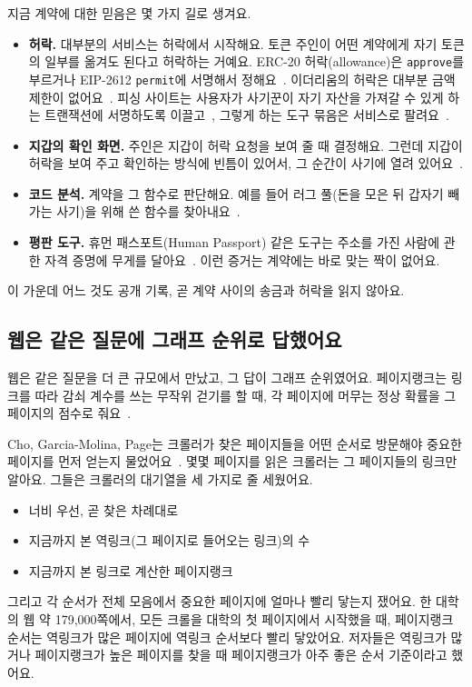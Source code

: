 지금 계약에 대한 믿음은 몇 가지 길로 생겨요.
\begin{itemize}
\item \textbf{허락.} 대부분의 서비스는 허락에서 시작해요. 토큰 주인이 어떤 계약에게 자기 토큰의 일부를 옮겨도 된다고 허락하는 거예요. ERC-20 허락(allowance)은 \texttt{approve}를 부르거나 EIP-2612 \texttt{permit}에 서명해서 정해요~\cite{vogelsteller2015erc20,lundfall2020permit}. 이더리움의 허락은 대부분 금액 제한이 없어요~\cite{wang2022unlimited}. 피싱 사이트는 사용자가 사기꾼이 자기 자산을 가져갈 수 있게 하는 트랜잭션에 서명하도록 이끌고~\cite{he2023txphishscope}, 그렇게 하는 도구 묶음은 서비스로 팔려요~\cite{he2025drainer}.
\item \textbf{지갑의 확인 화면.} 주인은 지갑이 허락 요청을 보여 줄 때 결정해요. 그런데 지갑이 허락을 보여 주고 확인하는 방식에 빈틈이 있어서, 그 순간이 사기에 열려 있어요~\cite{adamczyk2025approval}.
\item \textbf{코드 분석.} 계약을 그 함수로 판단해요. 예를 들어 러그 풀(돈을 모은 뒤 갑자기 빼 가는 사기)을 위해 쓴 함수를 찾아내요~\cite{lin2024crpwarner}.
\item \textbf{평판 도구.} 휴먼 패스포트(Human Passport) 같은 도구는 주소를 가진 사람에 관한 자격 증명에 무게를 달아요~\cite{humanpassportnddocs}. 이런 증거는 계약에는 바로 맞는 짝이 없어요.
\end{itemize}
이 가운데 어느 것도 공개 기록, 곧 계약 사이의 송금과 허락을 읽지 않아요.

\subsection{웹은 같은 질문에 그래프 순위로 답했어요}

웹은 같은 질문을 더 큰 규모에서 만났고, 그 답이 그래프 순위였어요. 페이지랭크는 링크를 따라 감쇠 계수를 쓰는 무작위 걷기를 할 때, 각 페이지에 머무는 정상 확률을 그 페이지의 점수로 줘요~\cite{page1999pagerank,langville2006pagerank}.

Cho, Garcia-Molina, Page는 크롤러가 찾은 페이지들을 어떤 순서로 방문해야 중요한 페이지를 먼저 얻는지 물었어요~\cite{cho1998crawling}. 몇몇 페이지를 읽은 크롤러는 그 페이지들의 링크만 알아요. 그들은 크롤러의 대기열을 세 가지로 줄 세웠어요.
\begin{itemize}
\item 너비 우선, 곧 찾은 차례대로
\item 지금까지 본 역링크(그 페이지로 들어오는 링크)의 수
\item 지금까지 본 링크로 계산한 페이지랭크
\end{itemize}
그리고 각 순서가 전체 모음에서 중요한 페이지에 얼마나 빨리 닿는지 쟀어요. 한 대학의 웹 약 179,000쪽에서, 모든 크롤을 대학의 첫 페이지에서 시작했을 때, 페이지랭크 순서는 역링크가 많은 페이지에 역링크 순서보다 빨리 닿았어요. 저자들은 역링크가 많거나 페이지랭크가 높은 페이지를 찾을 때 페이지랭크가 아주 좋은 순서 기준이라고 했어요.

